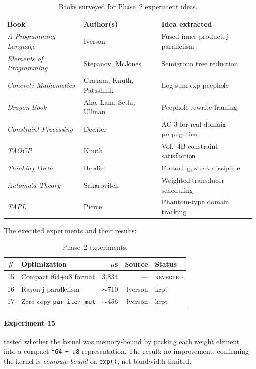 \documentclass[acmsmall,nonacm]{acmart}
\begin{document}
\begin{table}[h]
\caption{Books surveyed for Phase~2 experiment ideas.}
\label{tab:books}
\centering
\small
\begin{tabular}{lll}
\toprule
\textbf{Book} & \textbf{Author(s)} & \textbf{Idea extracted} \\
\midrule
\emph{A Programming Language} & Iverson & Fused inner product; j-parallelism \\
\emph{Elements of Programming} & Stepanov, McJones & Semigroup tree reduction \\
\emph{Concrete Mathematics} & Graham, Knuth, Patashnik & Log-sum-exp peephole \\
\emph{Dragon Book} & Aho, Lam, Sethi, Ullman & Peephole rewrite framing \\
\emph{Constraint Processing} & Dechter & AC-3 for real-domain propagation \\
\emph{TAOCP} & Knuth & Vol.~4B constraint satisfaction \\
\emph{Thinking Forth} & Brodie & Factoring, stack discipline \\
\emph{Automata Theory} & Sakarovitch & Weighted transducer scheduling \\
\emph{TAPL} & Pierce & Phantom-type domain tracking \\
\bottomrule
\end{tabular}
\end{table}

The executed experiments and their results:

\begin{table}[h]
\caption{Phase~2 experiments.}
\label{tab:phase2}
\centering
\begin{tabular}{rlrrl}
\toprule
\textbf{\#} & \textbf{Optimization} & \textbf{$\mu$s} & \textbf{Source} & \textbf{Status} \\
\midrule
15 & Compact f64+u8 format   & 3,834 & --- & \textsc{reverted} \\
16 & Rayon j-parallelism     & $\sim$710 & Iverson & kept \\
17 & Zero-copy \texttt{par\_iter\_mut} & $\sim$456 & Iverson & kept \\
\bottomrule
\end{tabular}
\end{table}

\paragraph{Experiment 15} tested whether the kernel was memory-bound by
packing each weight element into a compact \texttt{f64 + u8}
representation.  The result: no improvement, confirming the kernel is
\emph{compute-bound} on \texttt{exp()}, not bandwidth-limited.
\end{document}
